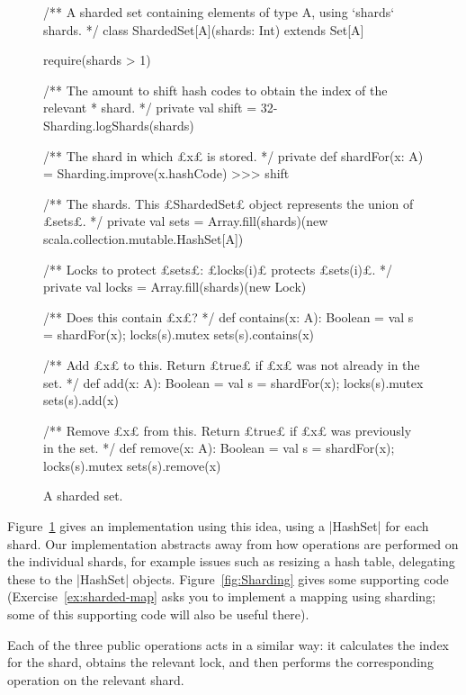 
\begin{figure}
\begin{scala}
/** A sharded set containing elements of type A, using `shards` shards. */
class ShardedSet[A](shards: Int) extends Set[A]{
  require(shards > 1)

  /** The amount to shift hash codes to obtain the index of the relevant
    * shard. */
  private val shift = 32-Sharding.logShards(shards)

  /** The shard in which £x£ is stored. */ 
  private def shardFor(x: A) = Sharding.improve(x.hashCode) >>> shift

  /** The shards.  This £ShardedSet£ object represents the union of £sets£. */ 
  private val sets = Array.fill(shards)(new scala.collection.mutable.HashSet[A])

  /** Locks to protect £sets£: £locks(i)£ protects £sets(i)£. */
  private val locks = Array.fill(shards)(new Lock)

  /** Does this contain £x£? */
  def contains(x: A): Boolean = {
    val s = shardFor(x); locks(s).mutex{ sets(s).contains(x) }
  }

  /** Add £x£ to this.  Return £true£ if £x£ was not already in the set. */
  def add(x: A): Boolean = {
    val s = shardFor(x); locks(s).mutex{ sets(s).add(x) }
  }

  /** Remove £x£ from this.  Return £true£ if £x£ was previously in the set. */
  def remove(x: A): Boolean = {
    val s = shardFor(x); locks(s).mutex{ sets(s).remove(x) }
  }
}
\end{scala}
\caption{A sharded set.}
\label{fig:ShardedSet}
\end{figure}


Figure~\ref{fig:ShardedSet} gives an implementation using this idea, using a
|HashSet| for each shard.  Our implementation abstracts away from how
operations are performed on the individual shards, for example issues such as
resizing a hash table, delegating these to the |HashSet| objects.
Figure~\ref{fig:Sharding} gives some supporting code
(Exercise~\ref{ex:sharded-map} asks you to implement a mapping using sharding;
some of this supporting code will also be useful there).

Each of the three public operations acts in a similar way: it calculates the
index for the shard, obtains the relevant lock, and then performs the
corresponding operation on the relevant shard.  


